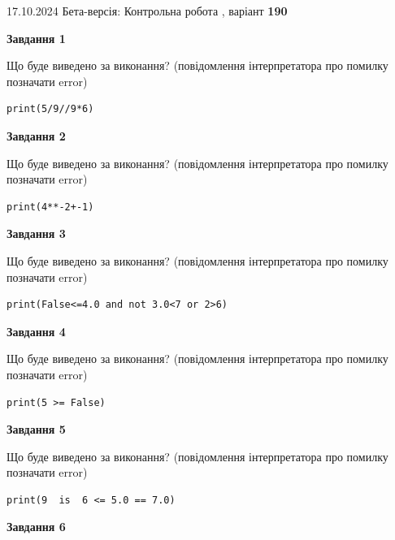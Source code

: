 \documentclass[12pt, ukrainian]{article}
\begin{document}
{\Large{17.10.2024 Бета-версія: Контрольна робота , варіант  \No \textbf { 190 }\par}}
{
\begin {large}
{\begin {center}\textbf{Завдання 1}\end {center}}

Що буде виведено за виконання? (повідомлення інтерпретатора про помилку позначати error)\par
\begin{verbatim}
print(5/9//9*6)
\end{verbatim}

{\begin {center}\textbf{Завдання 2}\end {center}}

Що буде виведено за виконання? (повідомлення інтерпретатора про помилку позначати error)\par
\begin{verbatim}
print(4**-2+-1)
\end{verbatim}

{\begin {center}\textbf{Завдання 3}\end {center}}

Що буде виведено за виконання? (повідомлення інтерпретатора про помилку позначати error)\par
\begin{verbatim}
print(False<=4.0 and not 3.0<7 or 2>6)
\end{verbatim}

{\begin {center}\textbf{Завдання 4}\end {center}}

Що буде виведено за виконання? (повідомлення інтерпретатора про помилку позначати error)\par
\begin{verbatim}
print(5 >= False)
\end{verbatim}

{\begin {center}\textbf{Завдання 5}\end {center}}

Що буде виведено за виконання? (повідомлення інтерпретатора про помилку позначати error)\par
\begin{verbatim}
print(9  is  6 <= 5.0 == 7.0)
\end{verbatim}

{\begin {center}\textbf{Завдання 6}\end {center}}


\end{large}}
\end{document}
